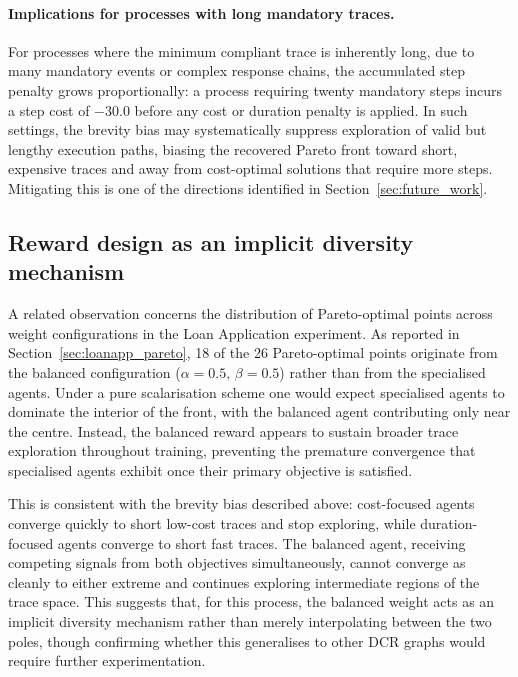 \paragraph{Implications for processes with long mandatory traces.} For processes where the minimum compliant trace is inherently long, due to many mandatory events or complex response chains, the accumulated step penalty grows proportionally: a process requiring twenty mandatory steps incurs a step cost of $-30.0$ before any cost or duration penalty is applied. In such settings, the brevity bias may systematically suppress exploration of valid but lengthy execution paths, biasing the recovered Pareto front toward short, expensive traces and away from cost-optimal solutions that require more steps. Mitigating this is one of the directions identified in Section~\ref{sec:future_work}.

\subsection{Reward design as an implicit diversity mechanism}

A related observation concerns the distribution of Pareto-optimal points across weight configurations in the Loan Application experiment. As reported in Section~\ref{sec:loanapp_pareto}, 18 of the 26 Pareto-optimal points originate from the balanced configuration ($\alpha=0.5,\,\beta=0.5$) rather than from the specialised agents. Under a pure scalarisation scheme one would expect specialised agents to dominate the interior of the front, with the balanced agent contributing only near the centre. Instead, the balanced reward appears to sustain broader trace exploration throughout training, preventing the premature convergence that specialised agents exhibit once their primary objective is satisfied.

This is consistent with the brevity bias described above: cost-focused agents converge quickly to short low-cost traces and stop exploring, while duration-focused agents converge to short fast traces. The balanced agent, receiving competing signals from both objectives simultaneously, cannot converge as cleanly to either extreme and continues exploring intermediate regions of the trace space. This suggests that, for this process, the balanced weight acts as an implicit diversity mechanism rather than merely interpolating between the two poles, though confirming whether this generalises to other \ac{DCR} graphs would require further experimentation.

